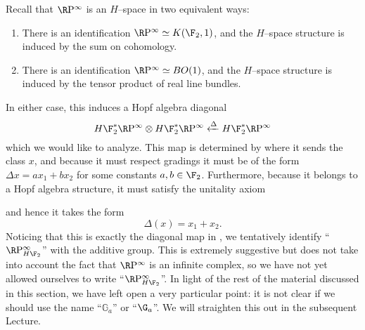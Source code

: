 \begin{example}\label{RPExampleFaulty}
Recall that $\RP^\infty$ is an $H$--space in two equivalent ways:
\begin{enumerate}
\item There is an identification $\RP^\infty \simeq K(\F_2, 1)$, and the $H$--space structure is induced by the sum on cohomology.
\item There is an identification $\RP^\infty \simeq BO(1)$, and the $H$--space structure is induced by the tensor product of real line bundles.
\end{enumerate}
In either case, this induces a Hopf algebra diagonal \[H\F_2^* \RP^\infty \otimes H\F_2^* \RP^\infty \xleftarrow\Delta H\F_2^* \RP^\infty\] which we would like to analyze.  This map is determined by where it sends the class $x$, and because it must respect gradings it must be of the form $\Delta x = ax_1 + bx_2$ for some constants $a, b \in \F_2$.  Furthermore, because it belongs to a Hopf algebra structure, it must satisfy the unitality axiom
\begin{center}
\end{center}
and hence it takes the form \[\Delta(x) = x_1 + x_2.\]  Noticing that this is exactly the diagonal map in , we tentatively identify ``$\RP^\infty_{H\F_2}$'' with the additive group.  This is extremely suggestive but does not take into account the fact that $\RP^\infty$ is an infinite complex, so we have not yet allowed ourselves to write ``$\RP^\infty_{H\F_2}$''.  In light of the rest of the material discussed in this section, we have left open a very particular point: it is not clear if we should use the name ``$\mathbb G_a$'' or ``$\G_a$''.  We will straighten this out in the subsequent Lecture.
\end{example}








